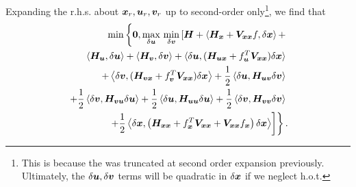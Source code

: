 Expanding the r.h.s. about $\bm{x}_r, \bm{u}_r, \bm{v}_r$ up to second-order only\footnote{This is because the \lhs was truncated at  second order expansion previously. Ultimately, the $\delta \bm{u}, \delta \bm{v}$ terms will be quadratic in $\delta \bm{x}$ if we neglect h.o.t.}, we find that
%
\begin{align}
	\begin{split} 
		\min \left\{\bm{0},  
		\max_{\delta \control} \, \min_{\delta \disturb} \left[\hamfunc + \left\langle \hamfunc_{\state}  + \valuefunc_{\state \state} f, \delta \state\right\rangle + \right. \right. \\
		\left. \left. \langle \hamfunc_{\control }, \delta \control \rangle + \langle \hamfunc_{\disturb }, \delta \disturb \rangle +  \langle \delta \control, (\hamfunc_{\control  \state} + f_{\control}^T \valuefunc_{\state \state}) \delta \state  \rangle \right. \right. \\
		\left. \left. 
		+  \left\langle \delta \disturb, (\hamfunc_{\disturb  \state} + f_{\disturb}^T \valuefunc_{\state \state}) \delta \state  \right\rangle + \dfrac{1}{2}\left\langle\delta \control, \hamfunc_{\control  \disturb} \delta \disturb  \right\rangle  \right. \right. \\
		\left. \left. 
		 + \dfrac{1}{2}\left\langle\delta \disturb, \hamfunc_{\disturb  \control} \delta \control \right\rangle +  \dfrac{1}{2} \left\langle \delta \control, \hamfunc_{\control  \control} \delta \control \right\rangle +  \dfrac{1}{2} \left\langle \delta \disturb, \hamfunc_{\disturb  \disturb} \delta \disturb \right\rangle \right. \right. \\
		\left. \left. 
		+    \dfrac{1}{2} \left\langle \delta \state, \left(\hamfunc_{\state \state} + f_{\state}^T \valuefunc_{\state \state}  + \valuefunc_{\state \state} f_{\state} \right) \delta \state \right\rangle \right] \right\}. 
	\end{split}
\label{eq:rob_rhs}
\end{align}

